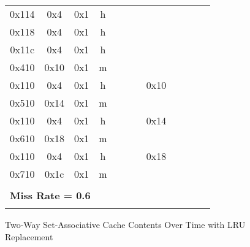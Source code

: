 \documentclass[10pt]{article}
\begin{document}
\begin{figure}[H]
\begin{tabular}{@{\extracolsep{3pt}}cccccccccccc@{}}
0x114 & 0x4 & 0x1 & h &     &     &     &     &     &     &     &     \\
0x118 & 0x4 & 0x1 & h &     &     &     &     &     &     &     &     \\
0x11c & 0x4 & 0x1 & h &     &     &     &     &     &     &     &     \\
0x410 & 0x10& 0x1 & m &     &     &     &     &     &     &     &     \\
0x110 & 0x4 & 0x1 & h &     &     &     & 0x10&     &     &     &     \\
0x510 & 0x14& 0x1 & m &     &     &     &     &     &     &     &     \\
0x110 & 0x4 & 0x1 & h &     &     &     & 0x14&     &     &     &     \\
0x610 & 0x18& 0x1 & m &     &     &     &     &     &     &     &     \\
0x110 & 0x4 & 0x1 & h &     &     &     & 0x18&     &     &     &     \\
0x710 & 0x1c& 0x1 & m &     &     &     &     &     &     &     &     \\
\Xhline{2\arrayrulewidth}
\multicolumn{12}{l}{\textbf{Number of Misses = 12}} \\
\hline
\multicolumn{12}{l}{\textbf{Miss Rate = 0.6}} \\
\Xhline{2\arrayrulewidth}
\end{tabular}
\caption{Two-Way Set-Associative Cache Contents Over Time with LRU Replacement}
\end{figure}
\end{document}
